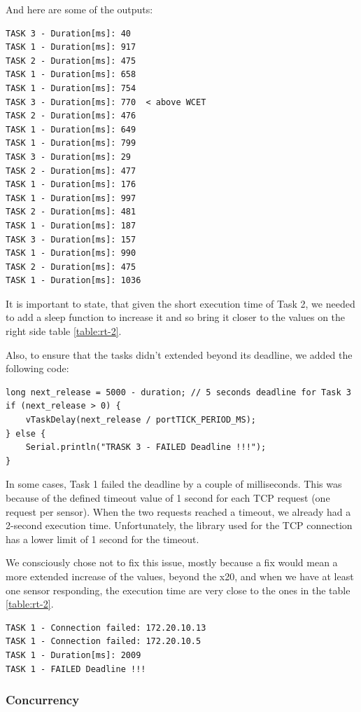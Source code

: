 \documentclass[11pt]{article}
\begin{document}
\noindent
And here are some of the outputs:

\begin{verbatim}
TASK 3 - Duration[ms]: 40
TASK 1 - Duration[ms]: 917
TASK 2 - Duration[ms]: 475
TASK 1 - Duration[ms]: 658
TASK 1 - Duration[ms]: 754
TASK 3 - Duration[ms]: 770  < above WCET
TASK 2 - Duration[ms]: 476
TASK 1 - Duration[ms]: 649
TASK 1 - Duration[ms]: 799
TASK 3 - Duration[ms]: 29
TASK 2 - Duration[ms]: 477
TASK 1 - Duration[ms]: 176
TASK 1 - Duration[ms]: 997
TASK 2 - Duration[ms]: 481
TASK 1 - Duration[ms]: 187
TASK 3 - Duration[ms]: 157
TASK 1 - Duration[ms]: 990
TASK 2 - Duration[ms]: 475
TASK 1 - Duration[ms]: 1036
\end{verbatim}

It is important to state, that given the short execution time of Task 2, we needed to add a sleep function to increase it and so bring it closer to the values on the right side table \ref{table:rt-2}.

Also, to ensure that the tasks didn't extended beyond its deadline, we added the following code:

\begin{verbatim}
long next_release = 5000 - duration; // 5 seconds deadline for Task 3
if (next_release > 0) {
    vTaskDelay(next_release / portTICK_PERIOD_MS);
} else {
    Serial.println("TRASK 3 - FAILED Deadline !!!");
}
\end{verbatim}

In some cases, Task 1 failed the deadline by a couple of milliseconds. This was because of the defined timeout value of 1 second for each TCP request (one request per sensor). When the two requests reached a timeout, we already had a 2-second execution time. Unfortunately, the library used for the TCP connection has a lower limit of 1 second for the timeout. 

We consciously chose not to fix this issue, mostly because a fix would mean a more extended increase of the values, beyond the x20, and when we have at least one sensor responding, the execution time are very close to the ones in the table \ref{table:rt-2}.

\begin{verbatim}
TASK 1 - Connection failed: 172.20.10.13
TASK 1 - Connection failed: 172.20.10.5
TASK 1 - Duration[ms]: 2009
TASK 1 - FAILED Deadline !!!
\end{verbatim}

\subsubsection{Concurrency}
\end{document}
